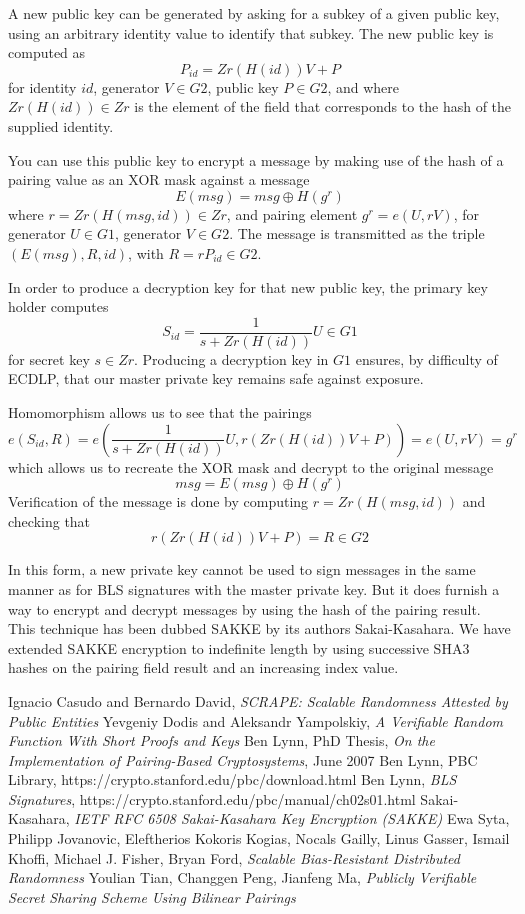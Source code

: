 \documentclass[article,oneside]{memoir}
\begin{document}
A new public key can be generated by asking for a subkey of a given public key, using an arbitrary identity value to identify that subkey. The new public key is computed as $$ P_{id} = Zr(H(id)) V + P$$ for identity $id$, generator $V \in G2$, public key $P \in G2$, and where $Zr(H(id)) \in Zr$ is the element of the field that corresponds to the hash of the supplied identity. 

You can use this public key to encrypt a message by making use of the hash of a pairing value as an XOR mask against a message $$E(msg) = msg \oplus H(g^r)$$ where $r = Zr(H(msg, id)) \in Zr$, and pairing element $g^r = e(U, r V)$, for generator $U \in G1$, generator $V \in G2$. The message is transmitted as the triple $(E(msg), R, id)$, with $R = r P_{id} \in G2$.

In order to produce a decryption key for that new public key, the primary key holder computes $$S_{id} = \frac{1}{s + Zr(H(id))} U \in G1$$ for secret key $s \in Zr$. Producing a decryption key in $G1$ ensures, by difficulty of ECDLP, that our master private key remains safe against exposure.

Homomorphism allows us to see that the pairings 
$$e(S_{id}, R) = e(\frac{1}{s + Zr(H(id))} U, r(Zr(H(id)) V + P)) = e(U, r V) = g^r$$ which allows us to recreate the XOR mask and decrypt to the original message $$msg = E(msg) \oplus H(g^r)$$ Verification of the message is done by computing $r = Zr(H(msg, id))$ and checking that $$r (Zr(H(id)) V + P) = R \in G2$$

In this form, a new private key cannot be used to sign messages in the same manner as for BLS signatures with the master private key. But it does furnish a way to encrypt and decrypt messages by using the hash of the pairing result. This technique has been dubbed SAKKE by its authors Sakai-Kasahara\cite{sakke}. We have extended SAKKE encryption to indefinite length by using successive SHA3 hashes on the pairing field result and an increasing index value.

\begin{thebibliography}{99}

Ignacio Casudo and Bernardo David, {\em{ SCRAPE: Scalable Randomness Attested by Public Entities}} 
Yevgeniy Dodis and Aleksandr Yampolskiy, {\em{A Verifiable Random Function With Short Proofs and Keys}}
 Ben Lynn, PhD Thesis, {\em{On the Implementation of Pairing-Based Cryptosystems}}, June 2007
 Ben Lynn, PBC Library, https://crypto.stanford.edu/pbc/download.html
 Ben Lynn, {\em{BLS Signatures}}, https://crypto.stanford.edu/pbc/manual/ch02s01.html
Sakai-Kasahara, {\em{IETF RFC 6508 Sakai-Kasahara Key Encryption (SAKKE)}} 
 Ewa Syta, Philipp Jovanovic, Eleftherios Kokoris Kogias, Nocals Gailly, Linus Gasser, Ismail Khoffi, Michael J. Fisher, Bryan Ford, {\em{Scalable Bias-Resistant Distributed Randomness}}
 Youlian Tian, Changgen Peng, Jianfeng Ma, {\em{Publicly Verifiable Secret Sharing Scheme Using Bilinear Pairings}} 
\end{thebibliography} 
\end{document}

